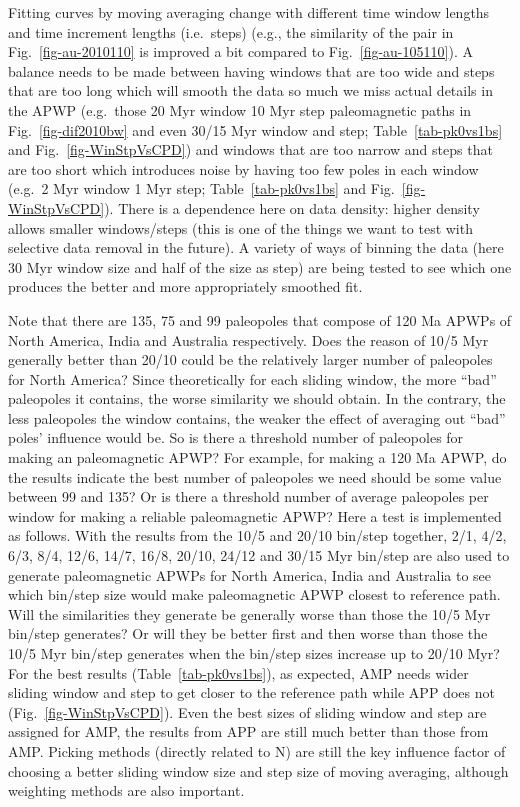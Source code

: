 Fitting curves by moving averaging change with different time window lengths and
time increment lengths (i.e.\ steps) (e.g., the similarity of the pair in
Fig.~\ref{fig-au-2010110} is improved a bit compared to
Fig.~\ref{fig-au-105110}). A balance needs to be made between having windows
that are too wide and steps that are too long which will smooth the data so much
we miss actual details in the APWP (e.g.\ those 20 Myr window 10 Myr step
paleomagnetic paths in Fig.~\ref{fig-dif2010bw} and even 30/15 Myr window and
step; Table~\ref{tab-pk0vs1bs} and Fig.~\ref{fig-WinStpVsCPD}) and windows that
are too narrow and steps that are too short which introduces noise by having too
few poles in each window (e.g.\ 2 Myr window 1 Myr step;
Table~\ref{tab-pk0vs1bs} and Fig.~\ref{fig-WinStpVsCPD}). There is a dependence
here on data density: higher density allows smaller windows/steps (this is one
of the things we want to test with selective data removal in the future). A
variety of ways of binning the data (here 30 Myr window size and
half of the size as step) are being tested to see which one produces the better
and more appropriately smoothed fit.

Note that there are 135, 75 and 99 paleopoles that compose of 120 Ma
APWPs of North America, India and Australia respectively. Does the reason of
10/5 Myr generally better than 20/10 could be the relatively larger number of
paleopoles for North America? Since theoretically for each sliding window, the
more ``bad'' paleopoles it contains, the worse similarity we should obtain. In
the contrary, the less paleopoles the window contains, the weaker the effect of
averaging out ``bad'' poles' influence would be. So is there a threshold number
of paleopoles for making an paleomagnetic APWP\@? For example, for making a
120 Ma APWP, do the results indicate the best number of paleopoles
we need should be some value between 99 and 135? Or is there a threshold number
of average paleopoles per window for making a reliable paleomagnetic APWP\@?
Here a test is implemented as
follows. With the results from the 10/5 and 20/10 bin/step together, 2/1, 4/2,
6/3, 8/4, 12/6, 14/7, 16/8, 20/10, 24/12 and 30/15 Myr bin/step are also used to
generate paleomagnetic APWPs for North America, India and Australia to see which
bin/step size would make paleomagnetic APWP closest to reference path. Will the
similarities they generate be generally worse than those the 10/5 Myr bin/step
generates? Or will they be better first and then worse than those the 10/5 Myr
bin/step generates when the bin/step sizes increase up to 20/10 Myr? For the
best results (Table~\ref{tab-pk0vs1bs}), as expected, AMP needs wider sliding
window and step to get closer to the reference path while APP does not
(Fig.~\ref{fig-WinStpVsCPD}). Even the best sizes of sliding window and step are
assigned for AMP, the results from APP are still much better than those from
AMP\@. Picking methods (directly related to N) are still the key influence
factor of choosing a better sliding window size and step size of moving
averaging, although weighting methods are also important.

